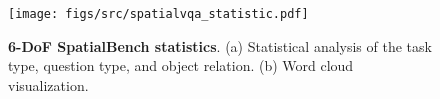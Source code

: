 \begin{figure}[t!]
\begin{center}
\texttt{[image: figs/src/spatialvqa\_statistic.pdf]}
\vspace{-15pt}
\caption{\textbf{6-DoF SpatialBench statistics}. (a) Statistical analysis of the task type, question type, and object relation. (b) Word cloud visualization.}
\label{fig:spatialvqa_statistic}
\end{center}
\end{figure}
